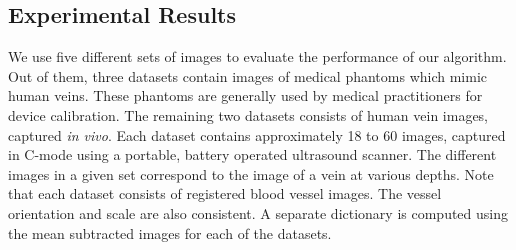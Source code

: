 \subsection{Experimental Results}
We use five different sets of images to evaluate the performance of our algorithm. Out of them, three datasets contain images of medical phantoms which mimic human veins. These phantoms are generally used by medical practitioners for device calibration. The remaining two datasets consists of human vein images, captured \textit{in vivo}. Each dataset contains approximately 18 to 60 images, captured in C-mode using a portable, battery operated ultrasound scanner. The different images in a given set correspond to the image of a vein at various depths. Note that each dataset consists of registered blood vessel images. The vessel orientation and scale are also consistent. A separate dictionary is computed using the mean subtracted images for each of the datasets. 
